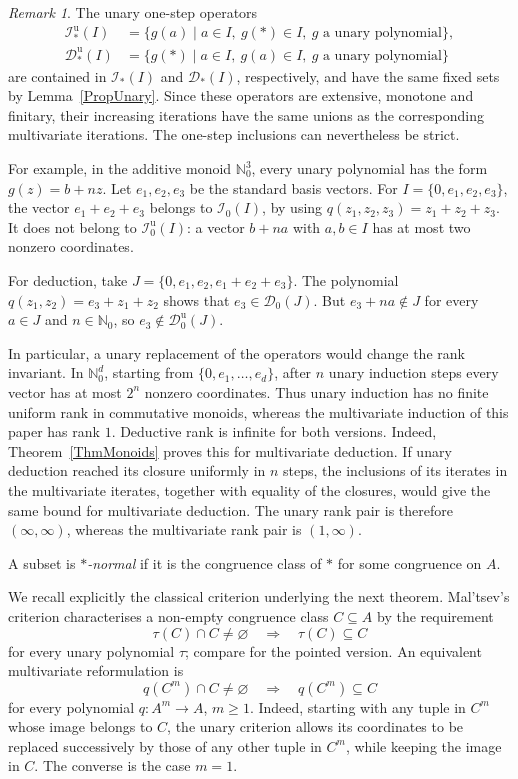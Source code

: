 \documentclass[12pt,english]{amsart}
\theoremstyle{definition}
\numberwithin{equation}{section}
\theoremstyle{remark}
\newtheorem{remark}[theorem]{Remark}
\newcommand{\ind}[1]{\mathcal{I}_\top(#1)}
\newcommand{\ded}[1]{\mathcal{D}_\top(#1)}
\renewcommand{\top}{\ast}
\begin{document}
\begin{remark}\label{RemUnarySteps}
The unary one-step operators
\begin{align*}
\mathcal I_\top^{\mathrm u}(I)
&=\{g(a)\mid a\in I,\ g(\top)\in I,\ g\text{ a unary polynomial}\},\\
\mathcal D_\top^{\mathrm u}(I)
&=\{g(\top)\mid a\in I,\ g(a)\in I,\ g\text{ a unary polynomial}\}
\end{align*}
are contained in $\ind I$ and $\ded I$, respectively, and have the same fixed sets by Lemma~\ref{PropUnary}. Since these operators are extensive, monotone and finitary, their increasing iterations have the same unions as the corresponding multivariate iterations. The one-step inclusions can nevertheless be strict.

For example, in the additive monoid $\mathbb N_0^3$, every unary polynomial has the form $g(z)=b+nz$. Let $e_1,e_2,e_3$ be the standard basis vectors. For $I=\{0,e_1,e_2,e_3\}$, the vector $e_1+e_2+e_3$ belongs to $\mathcal I_0(I)$, by using $q(z_1,z_2,z_3)=z_1+z_2+z_3$. It does not belong to $\mathcal I_0^{\mathrm u}(I)$: a vector $b+na$ with $a,b\in I$ has at most two nonzero coordinates.

For deduction, take $J=\{0,e_1,e_2,e_1+e_2+e_3\}$. The polynomial $q(z_1,z_2)=e_3+z_1+z_2$ shows that $e_3\in\mathcal D_0(J)$. But $e_3+na\notin J$ for every $a\in J$ and $n\in\mathbb N_0$, so $e_3\notin\mathcal D_0^{\mathrm u}(J)$.

In particular, a unary replacement of the operators would change the rank invariant. In $\mathbb N_0^d$, starting from $\{0,e_1,\ldots,e_d\}$, after $n$ unary induction steps every vector has at most $2^n$ nonzero coordinates. Thus unary induction has no finite uniform rank in commutative monoids, whereas the multivariate induction of this paper has rank $1$. Deductive rank is infinite for both versions. Indeed, Theorem~\ref{ThmMonoids} proves this for multivariate deduction. If unary deduction reached its closure uniformly in $n$ steps, the inclusions of its iterates in the multivariate iterates, together with equality of the closures, would give the same bound for multivariate deduction. The unary rank pair is therefore $(\infty,\infty)$, whereas the multivariate rank pair is $(1,\infty)$.
\end{remark}

A subset is \emph{$\top$-normal} if it is the congruence class of $\top$ for some congruence on $A$.

We recall explicitly the classical criterion underlying the next theorem. Mal'tsev's criterion \cite{Mal54} characterises a non-empty congruence class $C\subseteq A$ by the requirement
\[
\tau(C)\cap C\neq\varnothing
\quad\Longrightarrow\quad
\tau(C)\subseteq C
\]
for every unary polynomial $\tau$; compare \cite[Proposition 1.4(3)]{AU92} for the pointed version. An equivalent multivariate reformulation is
\[
q(C^m)\cap C\neq\varnothing
\quad\Longrightarrow\quad
q(C^m)\subseteq C
\]
for every polynomial $q\colon A^m\to A$, $m\geqslant1$. Indeed, starting with any tuple in $C^m$ whose image belongs to $C$, the unary criterion allows its coordinates to be replaced successively by those of any other tuple in $C^m$, while keeping the image in $C$. The converse is the case $m=1$.
\end{document}
